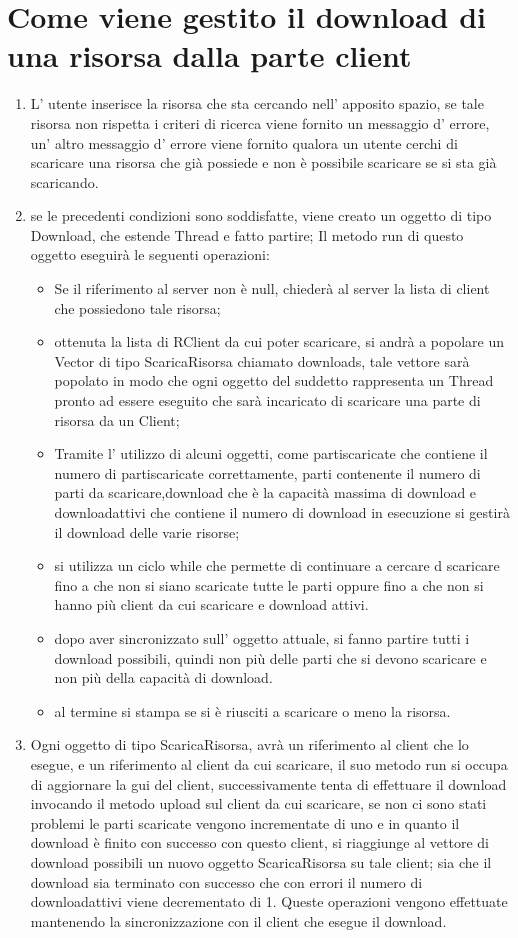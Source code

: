 \documentclass[12pt]{article}
\begin{document}
\section{Come viene gestito il download di una risorsa dalla parte client}
\begin{enumerate}
\item L' utente inserisce la risorsa che sta cercando nell' apposito spazio, se tale risorsa non rispetta i criteri di ricerca viene fornito un messaggio d' errore, un' altro messaggio d' errore viene fornito qualora un utente cerchi di scaricare una risorsa che già possiede e non è possibile scaricare se si sta già scaricando.
\item se le precedenti condizioni sono soddisfatte, viene creato un oggetto di tipo Download, che estende Thread e fatto partire; Il metodo run di questo oggetto eseguirà le seguenti operazioni:
	\begin{itemize}
		\item Se il riferimento al server non è null, chiederà al server la lista di client che possiedono tale risorsa;
		\item ottenuta  la lista di RClient da cui poter scaricare, si andrà a popolare un Vector di tipo ScaricaRisorsa chiamato downloads, tale vettore sarà popolato in modo che ogni oggetto del suddetto rappresenta un Thread pronto ad essere eseguito che sarà incaricato di scaricare una parte di risorsa da un Client;
		\item Tramite l' utilizzo di alcuni oggetti, come partiscaricate che contiene il numero di partiscaricate correttamente, parti contenente il numero di parti da scaricare,download che è la capacità massima di download e downloadattivi che contiene il numero di download in esecuzione si gestirà il download delle varie risorse;
		\item si utilizza un ciclo while che permette di continuare a cercare d scaricare fino a che non si siano scaricate tutte le parti oppure fino a che non si hanno più client da cui scaricare e download attivi.
		\item dopo aver sincronizzato sull' oggetto attuale,  si fanno partire tutti i download possibili, quindi non più delle parti che si devono scaricare e non più della capacità di download.
		\item al termine si stampa se si è riusciti  a scaricare o meno la risorsa.
	\end{itemize}
	\item Ogni oggetto di tipo ScaricaRisorsa, avrà un riferimento al client che lo esegue, e un riferimento al client da cui scaricare, il suo metodo run si occupa di aggiornare la gui del client, successivamente tenta di effettuare il download invocando il metodo upload sul client da cui scaricare, se non ci sono stati problemi le parti scaricate vengono incrementate di uno e in quanto il download è finito con successo con questo client, si riaggiunge al vettore di download possibili un nuovo oggetto ScaricaRisorsa su tale client; sia che il download sia terminato con successo che con errori il numero di downloadattivi viene decrementato di 1. Queste operazioni vengono effettuate mantenendo la sincronizzazione con il client che esegue il download.
\end{enumerate}
\end{document}
